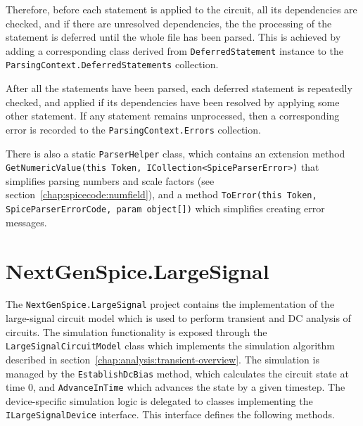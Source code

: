 Therefore, before each statement is applied to the circuit, all its dependencies are checked, and if there are unresolved dependencies, the the processing of the statement is deferred until the whole file has been parsed. This is achieved by adding a corresponding class derived from \texttt{DeferredStatement} instance to the \texttt{ParsingContext\+.DeferredStatements} collection.

After all the statements have been parsed, each deferred statement is repeatedly checked, and applied if its dependencies have been resolved by applying some other statement. If any statement remains unprocessed, then a corresponding error is recorded to the \texttt{ParsingContext.Errors} collection.

There is also a static \texttt{ParserHelper} class, which contains an extension method \texttt{GetNumericValue(this Token, ICollection<SpiceParserError>)} that simplifies parsing numbers and scale factors (see section~\ref{chap:spicecode:numfield}), and a method \texttt{ToError\+(this Token, SpiceParserErrorCode, param object[])} which simplifies creating error messages.

\section{NextGenSpice.LargeSignal}
\label{chap:devdocs:large-signal}

The \texttt{NextGenSpice.LargeSignal} project contains the implementation of the large-signal circuit model which is used to perform transient and DC analysis of circuits. The simulation functionality is exposed through the \texttt{LargeSignal\+CircuitModel} class which implements the simulation algorithm described in section~\ref{chap:analysis:transient-overview}. The simulation is managed by the \texttt{EstablishDcBias} method, which calculates the circuit state at time 0, and \texttt{AdvanceInTime} which advances the state by a given timestep. The device-specific simulation logic is delegated to classes implementing the \texttt{ILargeSignalDevice} interface. This interface defines the following methods.

